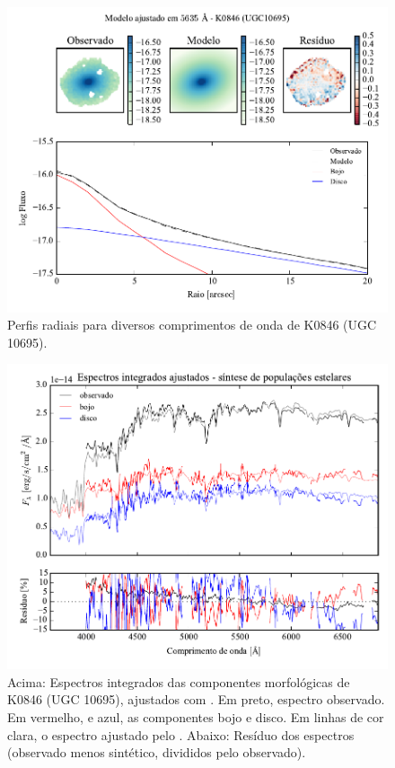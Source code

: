 \begin{figure}
	\includegraphics[page=5]{figuras-decomp/K0846_sample006a}
	\caption[Perfis radiais para diversos comprimentos de onda de K0846 (UGC 10695)]
	{Perfis radiais para diversos comprimentos de onda de K0846 (UGC 10695).}
	\label{fig:decompRadprofSpec:K0846}
\end{figure}

\begin{figure}
	\includegraphics[page=11,width=\textwidth]{figuras/sample006a_synthesis}
	\caption[Espectros ajustados com \starlight das componentes morfológicas de
	K0846 (UGC 10695)]
	{Acima: Espectros integrados das componentes morfológicas de
	K0846 (UGC 10695), ajustados com \starlight. Em preto, espectro observado. Em
	vermelho, e azul, as componentes bojo e disco. Em linhas de cor clara, o
	espectro ajustado pelo \starlight. Abaixo: Resíduo dos espectros (observado
	menos sintético, divididos pelo observado).}
	\label{fig:decompSintese:K0846}
\end{figure}

